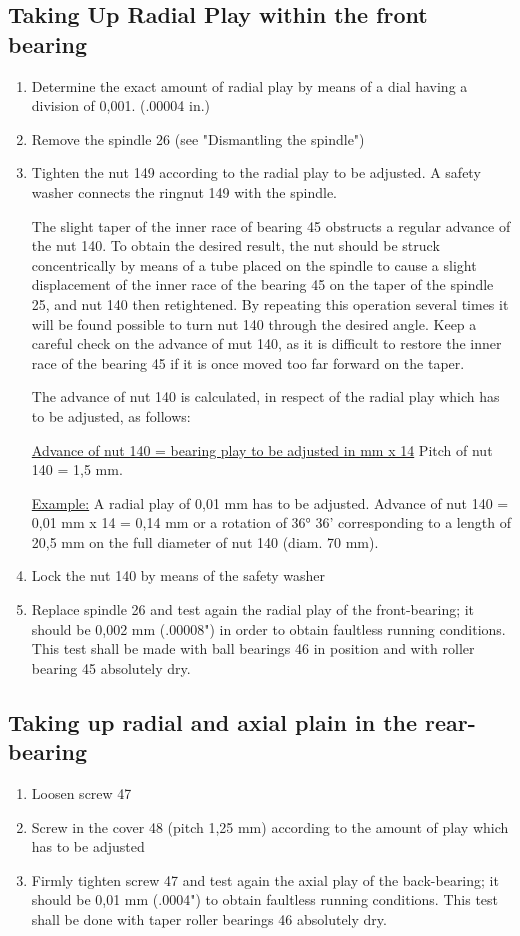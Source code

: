 \subsection*{Taking Up Radial Play within the front bearing}

\begin{enumerate}
    \item Determine the exact amount of radial play by means of a dial having a division of 0,001. (.00004 in.)
    \item Remove the spindle 26 (see "Dismantling the spindle")
    \item Tighten the nut 149 according to the radial play to be adjusted. A safety washer connects the ringnut 149 with the spindle.

    The slight taper of the inner race of bearing 45 obstructs a regular advance of the nut 140.
    To obtain the desired result, the nut should be struck concentrically by means of a tube placed
    on the spindle to cause a slight displacement of the inner race of the bearing 45 on the taper
    of the spindle 25, and nut 140 then retightened. By repeating this operation several times it will
    be found possible to turn nut 140 through the desired angle. Keep a careful check on the advance
    of mut 140, as it is difficult to restore the inner race of the bearing 45 if it is once moved
    too far forward on the taper.

    The advance of nut 140 is calculated, in respect of the radial play which has to be adjusted,
    as follows:

    \ul{Advance of nut 140 = bearing play to be adjusted in mm x 14}
    Pitch of nut 140 = 1,5 mm.

    \ul{Example:} A radial play of 0,01 mm has to be adjusted.
    Advance of nut 140 = 0,01 mm x 14 = 0,14 mm or a rotation of 36° 36' corresponding to a length
    of 20,5 mm on the full diameter of nut 140 (diam. 70 mm).

    \item Lock the nut 140 by means of the safety washer
    \item Replace spindle 26 and test again the radial play of the front-bearing; it should be 0,002 mm
    (.00008") in order to obtain faultless running conditions. This test shall be made with ball
    bearings 46 in position and with roller bearing 45 absolutely dry.
\end{enumerate}

\subsection*{Taking up radial and axial plain in the rear-bearing}

\begin{enumerate}
    \item Loosen screw 47
    \item Screw in the cover 48 (pitch 1,25 mm) according to the amount of play which has to be adjusted
    \item Firmly tighten screw 47 and test again the axial play of the back-bearing; it should be 0,01 mm
    (.0004") to obtain faultless running conditions. This test shall be done with taper roller bearings
    46 absolutely dry.
\end{enumerate}
